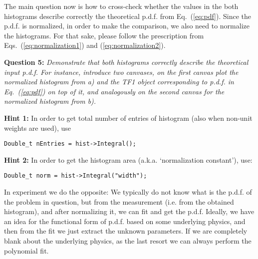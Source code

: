 \documentclass[11pt]{article}
\begin{document}
\bigskip

\noindent The main question now is how to cross-check whether the values in the both histograms describe correctly the theoretical p.d.f. from Eq.~(\ref{eq:pdf}). Since the p.d.f. is normalized, in order to make the comparison, we also need to normalize the histograms. For that sake, please follow the prescription from Eqs.~(\ref{eq:normalization1}) and (\ref{eq:normalization2}).

\bigskip

\noindent\textbf{Question 5:} {\it Demonstrate that both histograms correctly describe the theoretical input p.d.f. For instance, introduce two canvases, on the first canvas plot the normalized histogram from a) and the TF1 object corresponding to p.d.f. in Eq.~(\ref{eq:pdf}) on top of it, and analogously on the second canvas for the normalized histogram from b).}

\bigskip

\noindent \textbf{{Hint 1:}} In order to get total number of entries of histogram (also when non-unit weights are used), use
{\small
\begin{verbatim}
Double_t nEntries = hist->Integral();
\end{verbatim}
}

\noindent \textbf{{Hint 2:}} In order to get the histogram area (a.k.a. `normalization constant'), use:
{\small
\begin{verbatim}
Double_t norm = hist->Integral("width");
\end{verbatim}
}

\bigskip

In experiment we do the opposite: We typically do not know what is the p.d.f. of the problem in question, but from the measurement (i.e. from the obtained histogram), and after normalizing it, we can fit and get the p.d.f. Ideally, we have an idea for the functional form of p.d.f. based on some underlying physics, and then from the fit we just extract the unknown parameters. If we are completely blank about the underlying physics, as the last resort we can always perform the polynomial fit.
\end{document}
